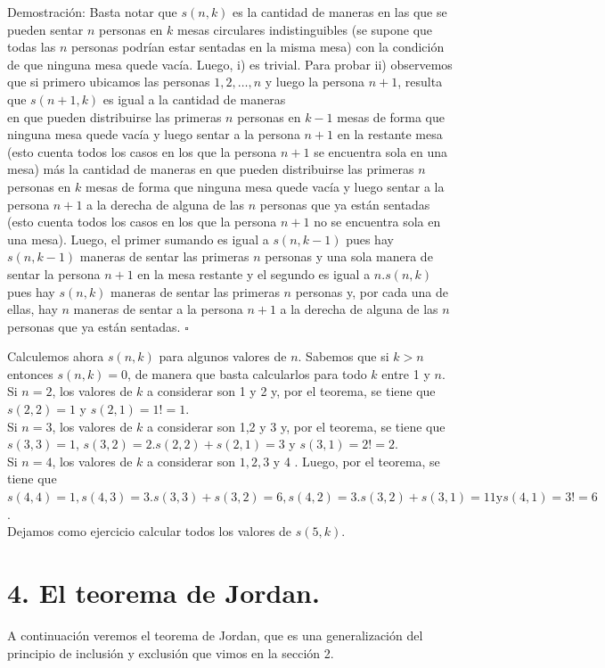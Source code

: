 \documentclass[10pt]{article}
\begin{document}
Demostración: Basta notar que $s(n, k)$ es la cantidad de maneras en las que se pueden sentar $n$ personas en $k$ mesas circulares indistinguibles (se supone que todas las $n$ personas podrían estar sentadas en la misma mesa) con la condición de que ninguna mesa quede vacía. Luego, i) es trivial. Para probar ii) observemos que si primero ubicamos las personas $1,2, \ldots, n$ y luego la persona $n+1$, resulta que $s(n+1, k)$ es igual a la cantidad de maneras\\
en que pueden distribuirse las primeras $n$ personas en $k-1$ mesas de forma que ninguna mesa quede vacía y luego sentar a la persona $n+1$ en la restante mesa (esto cuenta todos los casos en los que la persona $n+1$ se encuentra sola en una mesa) más la cantidad de maneras en que pueden distribuirse las primeras $n$ personas en $k$ mesas de forma que ninguna mesa quede vacía y luego sentar a la persona $n+1$ a la derecha de alguna de las $n$ personas que ya están sentadas (esto cuenta todos los casos en los que la persona $n+1$ no se encuentra sola en una mesa). Luego, el primer sumando es igual a $s(n, k-1)$ pues hay $s(n, k-1)$ maneras de sentar las primeras $n$ personas y una sola manera de sentar la persona $n+1$ en la mesa restante y el segundo es igual a $n . s(n, k)$ pues hay $s(n, k)$ maneras de sentar las primeras $n$ personas y, por cada una de ellas, hay $n$ maneras de sentar a la persona $n+1$ a la derecha de alguna de las $n$ personas que ya están sentadas. $\square$

Calculemos ahora $s(n, k)$ para algunos valores de $n$. Sabemos que si $k>n$ entonces $s(n, k)=0$, de manera que basta calcularlos para todo $k$ entre 1 y $n$.\\
Si $n=2$, los valores de $k$ a considerar son 1 y 2 y, por el teorema, se tiene que $s(2,2)=1$ y $s(2,1)=1!=1$.\\
Si $n=3$, los valores de $k$ a considerar son 1,2 y 3 y, por el teorema, se tiene que $s(3,3)=1$, $s(3,2)=2 . s(2,2)+s(2,1)=3$ y $s(3,1)=2!=2$.\\
Si $n=4$, los valores de $k$ a considerar son $1,2,3$ y 4 . Luego, por el teorema, se tiene que $s(4,4)=1, s(4,3)=3 . s(3,3)+s(3,2)=6, s(4,2)=3 . s(3,2)+s(3,1)=11 \mathrm{y} s(4,1)=3!=6$.\\
Dejamos como ejercicio calcular todos los valores de $s(5, k)$.

\section*{4. El teorema de Jordan.}
A continuación veremos el teorema de Jordan, que es una generalización del principio de inclusión y exclusión que vimos en la sección 2.
\end{document}
